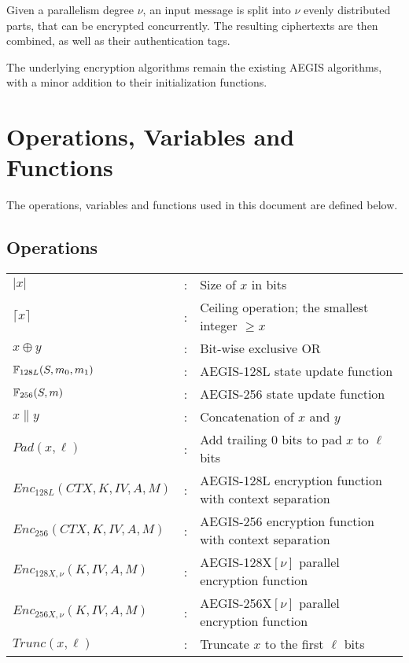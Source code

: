 \documentclass[envcountsame,runningheads,notitlepage]{llncs}
\begin{document}
Given a parallelism degree $\nu$, an input message is split into $\nu$ evenly distributed parts, that can be encrypted concurrently. The resulting ciphertexts are then combined, as well as their authentication tags.

The underlying encryption algorithms remain the existing AEGIS algorithms, with a minor addition to their initialization functions.

\section{Operations, Variables and Functions}
\label{sec:notation}

The operations, variables and functions used in this document are defined below.

\subsection{Operations}

\begin{tabular}{l c p{}}
  $\lvert x \rvert$              & : & Size of $x$ in bits                                    \\
  $\lceil x \rceil$              & : & Ceiling operation; the smallest integer $\geq x$       \\
  $x \oplus y$                   & : & Bit-wise exclusive OR                                  \\
  $\mathbb{F}_{128L}(S, m_0, m_1)$       & : & AEGIS-128L state update function                       \\
  $\mathbb{F}_{256}(S, m)$               & : & AEGIS-256 state update function                        \\
  $x \| y$                       & : & Concatenation of $x$ and $y$                           \\
  $Pad(x,\ell)$                  & : & Add trailing $0$ bits to pad $x$ to $\ell$ bits        \\
  $Enc_{128L}(CTX, K, IV, A, M)$ & : & AEGIS-128L encryption function with context separation \\
  $Enc_{256}(CTX, K, IV, A, M)$  & : & AEGIS-256 encryption function with context separation  \\
  $Enc_{128X,\nu}(K, IV, A, M)$  & : & AEGIS-128X$[\nu]$ parallel encryption function         \\
  $Enc_{256X,\nu}(K, IV, A, M)$  & : & AEGIS-256X$[\nu]$ parallel encryption function         \\
  $Trunc(x, \ell)$               & : & Truncate $x$ to the first $\ell$ bits                  \\
\end{tabular}
\end{document}
